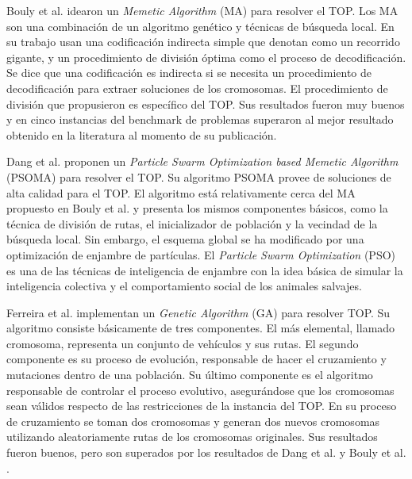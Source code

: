 \bigskip

Bouly et al. \cite{BoulyDangMoukrim} idearon un \textit{Memetic Algorithm} (MA) para resolver el TOP. Los MA son una combinación de un algoritmo genético y técnicas de búsqueda local. En su trabajo usan una codificación indirecta simple que denotan como un recorrido gigante, y un procedimiento de división óptima como el proceso de decodificación. Se dice que una codificación es indirecta si se necesita un procedimiento de decodificación para extraer soluciones de los cromosomas. El procedimiento de división que propusieron es específico del TOP. Sus resultados fueron muy buenos y en cinco instancias del benchmark de problemas superaron al mejor resultado obtenido en la literatura al momento de su publicación.

\bigskip

Dang et al. \cite{DangGuibadjMoukrim} proponen un \textit{Particle Swarm Optimization based Memetic Algorithm} (PSOMA) para resolver el TOP. Su algoritmo PSOMA provee de soluciones de alta calidad para el TOP. El algoritmo está relativamente cerca del MA propuesto en Bouly et al. \cite{BoulyDangMoukrim} y presenta los mismos componentes básicos, como la técnica de división de rutas, el inicializador de población y la vecindad de la búsqueda local. Sin embargo, el esquema global se ha modificado por una optimización de enjambre de partículas. El \textit{Particle Swarm Optimization} (PSO) es una de las técnicas de inteligencia de enjambre con la idea básica de simular la inteligencia colectiva y el comportamiento social de los animales salvajes.

\bigskip

Ferreira et al. \cite{FerreiraQuintasOliveiraPereiraDias} implementan un \textit{Genetic Algorithm} (GA) para resolver TOP. Su algoritmo consiste básicamente de tres componentes. El más elemental, llamado cromosoma, representa un conjunto de vehículos y sus rutas. El segundo componente es su proceso de evolución, responsable de hacer el cruzamiento y mutaciones dentro de una población. Su último componente es el algoritmo responsable de controlar el proceso evolutivo, asegurándose que los cromosomas sean válidos respecto de las restricciones de la instancia del TOP. En su proceso de cruzamiento se toman dos cromosomas y generan dos nuevos cromosomas utilizando aleatoriamente rutas de los cromosomas originales. Sus resultados fueron buenos, pero son superados por los resultados de Dang et al. \cite{DangGuibadjMoukrim} y Bouly et al. \cite{BoulyDangMoukrim}.

